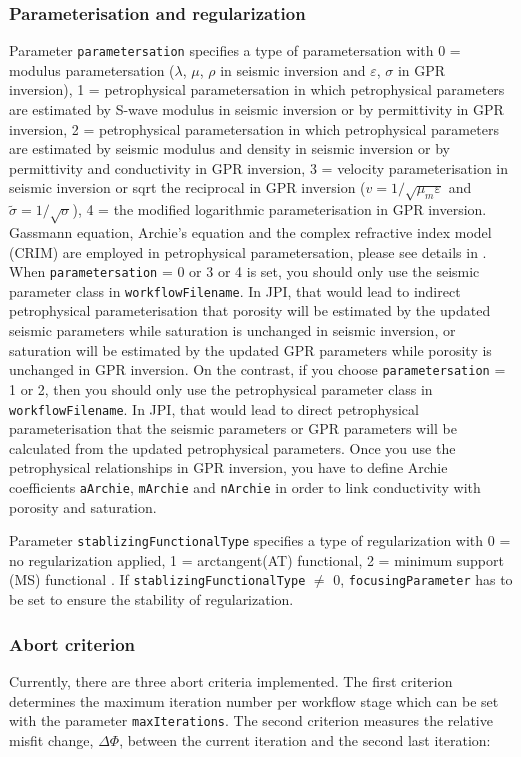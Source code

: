 \documentclass[pdftex,a4paper,parskip,listof=totoc,bibliography=totoc,onehalfspacing,12pt]{scrreprt}
\begin{document}
\subsubsection{Parameterisation and regularization}
Parameter \verb+parametersation+ specifies a type of parametersation with 0 = modulus parametersation ($\lambda$, $\mu$, $\rho$ in seismic inversion and $\varepsilon$, $\sigma$ in GPR inversion), 1 = petrophysical parametersation in which petrophysical parameters are estimated by S-wave modulus in seismic inversion or by permittivity in GPR inversion, 2 = petrophysical parametersation in which petrophysical parameters are estimated by seismic modulus and density in seismic inversion or by permittivity and conductivity in GPR inversion, 3 = velocity parameterisation in seismic inversion or sqrt the reciprocal in GPR inversion ($v=1/\sqrt{\mu_m \varepsilon}$ and $\widetilde{\sigma}=1/\sqrt{\sigma}$), 4 = the modified logarithmic parameterisation in GPR inversion. Gassmann equation, Archie's equation and the complex refractive index model (CRIM) are employed in petrophysical parametersation, please see details in \cite{qin2021joint}. When \verb+parametersation+ = 0 or 3 or 4 is set, you should only use the seismic parameter class in \verb+workflowFilename+. In JPI, that would lead to indirect petrophysical parameterisation  that porosity will be estimated by the updated seismic parameters while saturation is unchanged in seismic inversion, or saturation will be estimated by the updated GPR parameters while porosity is unchanged in GPR inversion. On the contrast, if you choose \verb+parametersation+ = 1 or 2, then you should only use the petrophysical parameter class in \verb+workflowFilename+. In JPI, that would lead to direct petrophysical parameterisation that the seismic parameters or GPR parameters will be calculated from the updated petrophysical parameters. Once you use the petrophysical relationships in GPR inversion, you have to define Archie coefficients \verb+aArchie+, \verb+mArchie+ and \verb+nArchie+ in order to link conductivity with porosity and saturation.

Parameter \verb+stablizingFunctionalType+ specifies a type of regularization with 0 = no regularization applied, 1 = arctangent(AT) functional, 2 = minimum support (MS) functional \citep{hu2017traveltime}. If \verb+stablizingFunctionalType+ $\neq$ 0, \verb+focusingParameter+ has to be set to ensure the stability of regularization.

\subsubsection{Abort criterion}\label{config:abort}
Currently, there are three abort criteria implemented. The first criterion determines the maximum iteration number per workflow stage which can be set with the parameter \verb+maxIterations+. The second criterion measures the relative misfit change, $\Delta \Phi$, between the current iteration and the second last iteration:
\end{document}
